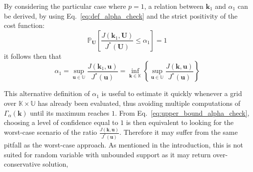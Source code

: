 \documentclass[preprint, 1p]{elsarticle}
\newcommand{\Prob}{\mathbb{P}}
\newcommand{\checka}{{\alpha}}
\newcommand{\checkk}{\mathbf{k}}
\newcommand{\checkkp}{{\mathbf{k}}_p}
\newcommand{\Kspace}{\mathbb{K}}
\newcommand{\Uspace}{\mathbb{U}}
\begin{document}


By considering the particular case where $p=1$, a relation between $\checkk_1$ and $\checka_1$ can be derived, by using Eq.~\eqref{eq:def_alpha_check} and the strict positivity of the cost function:
\begin{equation}
  \label{eq:def_alpha1}
  \Prob_{\mathbf{U}}\left[\frac{J(\mathbf{k}_1,\mathbf{U})}{ J^*(\mathbf{U}) } \leq \checka_1\right]=1
\end{equation}
it follows then that 
\begin{equation}
  \label{eq:upper_bound_alpha_check}
  \checka_1 = \sup_{\mathbf{u}\in\Uspace} \frac{J(\mathbf{k}_1,\mathbf{u})}{J^*(\mathbf{u})} =  \inf_{\mathbf{k}\in\Kspace} \left\{ \sup_{\mathbf{u}\in\Uspace} \frac{J(\mathbf{k},\mathbf{u})}{J^*(\mathbf{u})} \right\} 
\end{equation}

This alternative definition of $\checka_1$ is useful to estimate it quickly whenever a grid over $\mathbb{K}\times\mathbb{U}$ has already been evaluated, thus avoiding multiple computations of $\Gamma_{\alpha}(\mathbf{k})$ until its maximum reaches $1$. From Eq.~\eqref{eq:upper_bound_alpha_check}, choosing a level of confidence equal to $1$ is then equivalent to looking for the worst-case scenario of the ratio $\frac{J(\mathbf{k},\mathbf{u})}{J^*(\mathbf{u})}$. Therefore it may suffer from the same pitfall as the worst-case approach. As mentioned in the introduction, this is not suited for random variable with unbounded support as it may return over-conservative solution, 
\end{document}
